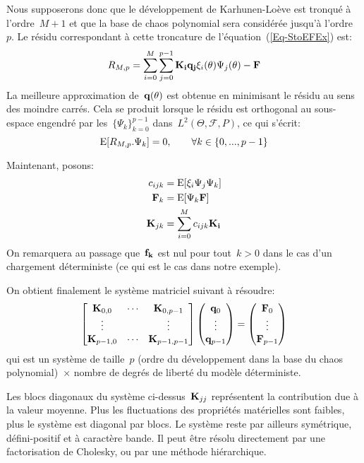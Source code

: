 \medskip
Nous supposerons donc que le développement de Karhunen-Loève est tronqué à l'ordre~$M+1$ et que la base de chaos polynomial sera considérée jusqu'à l'ordre~$p$. Le résidu correspondant à cette troncature de l'équation~(\ref{Eq-StoEFEx}) est:
\begin{equation}
R_{M,p} =
\dsum_{i=0}^M\dsum_{j=0}^{p-1} \MM{K_i}\VV{q_j}\xi_i(\theta)\Psi_j(\theta) - \VV{F}
\end{equation}
La meilleure approximation de~$\VV{q(\theta)}$ est obtenue en minimisant le résidu au sens des moindre carrés. Cela se produit lorsque le résidu est orthogonal au sous-espace engendré par les~$\{\Psi_k\}_{k=0}^{p-1}$ dans~$L^2(\Theta,\mathcal{F},P)$, ce qui s'écrit:
\begin{equation}
   \operatorname{E}[R_{M,p}.\Psi_k]=0, \qquad \forall k\in\{0, ..., p-1\}
\end{equation}

\medskip
Maintenant, posons:
\begin{align}
c_{ijk} & = \E{\xi_i\Psi_j\Psi_k}\\
\VV{F}_k & = \E{\Psi_k\VV{F}}\\
\MM{K}_{jk} & = \dsum_{i=0}^M c_{ijk}\MM{K_i}
\end{align}
On remarquera au passage que~$\VV{f_k}$ est nul pour tout~$k>0$ dans le cas d'un chargement déterministe (ce qui est le cas dans notre exemple).

\medskip
On obtient finalement le système matriciel suivant à résoudre:
\begin{equation}
\MM*{\MM{K}_{0,0} & \cdots & \MM{K}_{0,p-1}\\
\vdots & &\vdots\\
\MM{K}_{p-1,0} & \cdots & \MM{K}_{p-1,p-1}}
\VV*{\VV{q}_0 \\ \vdots \\ \VV{q}_{p-1}}
= \VV*{\VV{F}_0 \\ \vdots \\ \VV{F}_{p-1}}
\end{equation}
qui est un système de taille~$p$ (ordre du développement dans la base du chaos polynomial)~$\times$ nombre de degrés de liberté du modèle déterministe.

\medskip
Les blocs diagonaux du système ci-dessus~$\MM{K}_{jj}$ représentent la contribution due à la valeur moyenne. Plus les fluctuations des propriétés matérielles sont faibles, plus le système est diagonal par blocs. Le système reste par ailleurs symétrique, défini-positif et à caractère bande.
Il peut être résolu directement par une factorisation de Cholesky, ou par une méthode hiérarchique.


